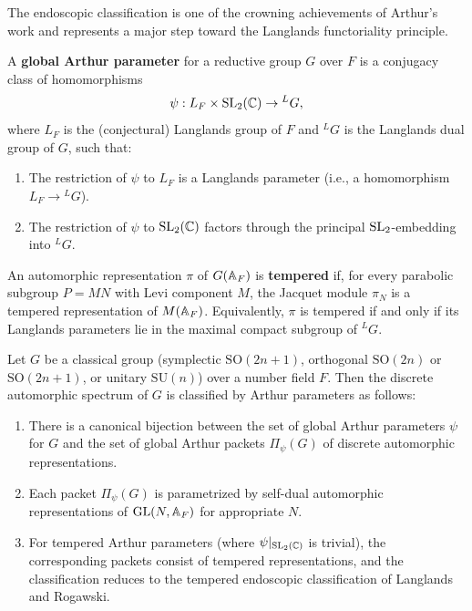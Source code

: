 The endoscopic classification is one of the crowning achievements of Arthur's work and represents a major step toward the Langlands functoriality principle.

\begin{definition}
A \textbf{global Arthur parameter} for a reductive group $G$ over $F$ is a conjugacy class of homomorphisms
\[
\psi: L_F \times \operatorname{SL}_2(\mathbb{C}) \to {}^L G,
\]
where $L_F$ is the (conjectural) Langlands group of $F$ and ${}^L G$ is the Langlands dual group of $G$, such that:
\begin{enumerate}
    \item The restriction of $\psi$ to $L_F$ is a Langlands parameter (i.e., a homomorphism $L_F \to {}^L G$).
    \item The restriction of $\psi$ to $\operatorname{SL}_2(\mathbb{C})$ factors through the principal $\operatorname{SL}_2$-embedding into ${}^L G$.
\end{enumerate}
\end{definition}

\begin{definition}
An automorphic representation $\pi$ of $G(\mathbb{A}_F)$ is \textbf{tempered} if, for every parabolic subgroup $P = MN$ with Levi component $M$, the Jacquet module $\pi_N$ is a tempered representation of $M(\mathbb{A}_F)$. Equivalently, $\pi$ is tempered if and only if its Langlands parameters lie in the maximal compact subgroup of ${}^L G$.
\end{definition}

\begin{theorem}
Let $G$ be a classical group (symplectic $\mathrm{SO}(2n+1)$, orthogonal $\mathrm{SO}(2n)$ or $\mathrm{SO}(2n+1)$, or unitary $\mathrm{SU}(n)$) over a number field $F$. Then the discrete automorphic spectrum of $G$ is classified by Arthur parameters as follows:
\begin{enumerate}
    \item There is a canonical bijection between the set of global Arthur parameters $\psi$ for $G$ and the set of global Arthur packets $\Pi_\psi(G)$ of discrete automorphic representations.
    \item Each packet $\Pi_\psi(G)$ is parametrized by self-dual automorphic representations of $\operatorname{GL}(N, \mathbb{A}_F)$ for appropriate $N$.
    \item For tempered Arthur parameters (where $\psi|_{\operatorname{SL}_2(\mathbb{C})}$ is trivial), the corresponding packets consist of tempered representations, and the classification reduces to the tempered endoscopic classification of Langlands and Rogawski.
\end{enumerate}
\end{theorem}

